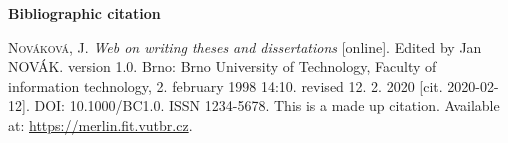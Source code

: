 \bigskip

\noindent \textbf{Bibliographic citation}

\medskip

\noindent \textsc{Nováková}, J. \textit{Web on writing theses and dissertations} [online]. Edited by Jan NOVÁK. version 1.0. Brno: Brno University of Technology, Faculty of information technology, 2. february 1998 14:10. revised 12. 2. 2020 [cit. 2020-02-12]. DOI: 10.1000/BC1.0. ISSN 1234-5678. This is a made up citation. Available at: \url{https://merlin.fit.vutbr.cz}.

